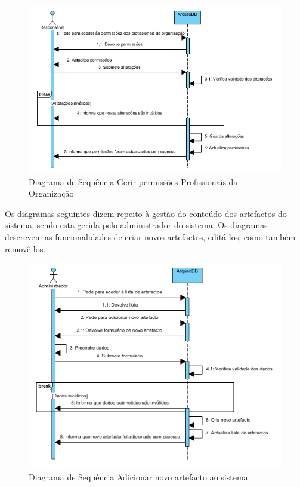 ﻿\documentclass[12pt,a4paper]{article}
\begin{document}
\begin{figure}[h!]
\centering
\includegraphics[scale=1]{sequencia/P_permissoes}
\caption{Diagrama de Sequência Gerir permissões Profissionais da Organização} 
\end{figure}  

\clearpage
Os diagramas seguintes dizem repeito à gestão do conteúdo dos artefactos do sistema, sendo esta gerida pelo administrador do sistema. Os diagramas descrevem as funcionalidades de criar novos artefactos, editá-los, como também  removê-los.\\

\begin{figure}[h!]
\centering
\includegraphics[scale=1]{sequencia/A_criarartefacto}
\caption{Diagrama de Sequência Adicionar novo artefacto ao sistema} 
\end{figure}  
\end{document}
